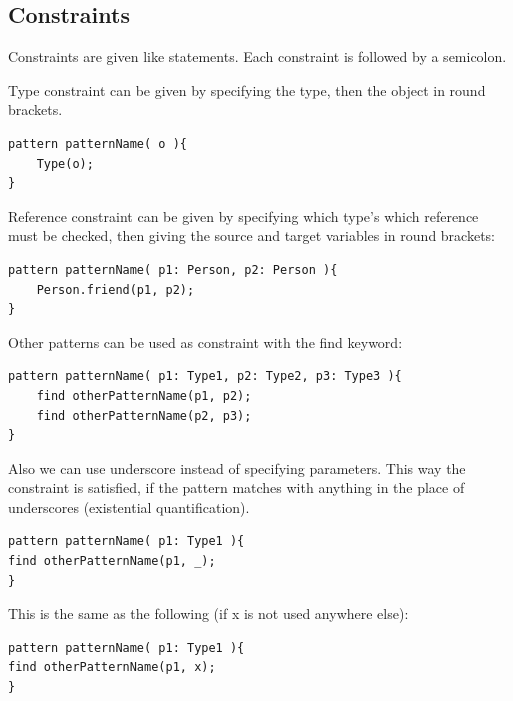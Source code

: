 \subsection{Constraints}
Constraints are given like statements. 
Each constraint is followed by a semicolon.

\vspace{\abovedisplayskip}
\begin{minipage}{\textwidth}
Type constraint can be given by specifying the type, then the object in round brackets.
\begin{lstlisting}[language=vql]
pattern patternName( o ){
	Type(o);
}
\end{lstlisting}
\end{minipage}
\vspace{\belowdisplayskip}

\begin{minipage}{\textwidth}
Reference constraint can be given by specifying which type's which reference must be checked, then giving the source and target variables in round brackets:
\begin{lstlisting}[language=vql]
pattern patternName( p1: Person, p2: Person ){
	Person.friend(p1, p2);
}
\end{lstlisting}
\end{minipage}
\vspace{\belowdisplayskip}

\begin{minipage}{\textwidth}
Other patterns can be used as constraint with the find keyword:
\begin{lstlisting}[language=vql]
pattern patternName( p1: Type1, p2: Type2, p3: Type3 ){
	find otherPatternName(p1, p2);
	find otherPatternName(p2, p3);
}
\end{lstlisting}

Also we can use underscore instead of specifying parameters. 
This way the constraint is satisfied, if the pattern matches with anything in the place of underscores (existential quantification).
\begin{lstlisting}[language=vql]
pattern patternName( p1: Type1 ){
find otherPatternName(p1, _);
}
\end{lstlisting}

This is the same as the following (if x is not used anywhere else):
\begin{lstlisting}[language=vql]
pattern patternName( p1: Type1 ){
find otherPatternName(p1, x);
}
\end{lstlisting}
\end{minipage}
\vspace{\belowdisplayskip}

